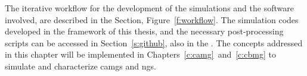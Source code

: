The iterative workflow for the development of the simulations and the software involved, are described in the  Section, Figure~\ref{f:workflow}. The simulation codes developed in the framework of this thesis, and the necessary post-processing scripts can be accessed in Section~\ref{s:github}, also in the . The concepts addressed in this chapter will be implemented in Chapters~\ref{c:camg}~and~\ref{c:cbmg} to simulate and characterize \gls{camg}s and \gls{ng}s.